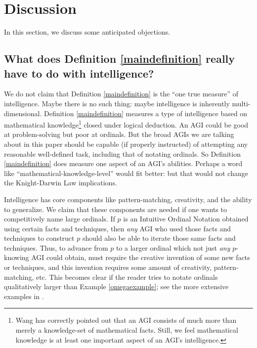 \documentclass[runningheads]{llncs}
\begin{document}
\section{Discussion}
\label{objectionsection}

In this section, we discuss some anticipated objections.

\subsection{What does Definition \ref{maindefinition} really have to do with intelligence?}

We do not claim that Definition \ref{maindefinition} is the ``one true measure'' of
intelligence. Maybe there is no such thing: maybe intelligence is inherently
multi-dimensional. Definition \ref{maindefinition} measures a type of
intelligence based on mathematical knowledge\footnote{Wang has
correctly pointed out \cite{wang2007} that an AGI consists of much more than merely
a knowledge-set of mathematical facts. Still, we feel mathematical knowledge is at least
one important aspect of an AGI's intelligence.} closed under logical deduction. An
AGI could be good at problem-solving
but poor at ordinals. But the broad AGIs we are talking about in this paper
should be capable (if properly
instructed) of attempting any reasonable well-defined task, including that of
notating ordinals. So Definition \ref{maindefinition} does
measure one aspect of an AGI's abilities. Perhaps
a word like
``mathematical-knowledge-level'' would fit better: but
that would not change
the Knight-Darwin Law implications.

Intelligence has core components like pattern-matching,
creativity, and the ability to generalize.
We claim that these components are needed if one wants to
competitively name large ordinals. If $p$ is an Intuitive Ordinal Notation
obtained using certain facts and techniques, then \emph{any} AGI who used those
facts and techniques to construct $p$ should also be able to iterate those same
facts and techniques.
Thus, to advance from
$p$ to a larger ordinal which not just \emph{any} $p$-knowing
AGI could obtain, must require
the creative invention of some new facts or techniques, and
this invention requires some amount of creativity,
pattern-matching, etc. This becomes clear if the reader tries to
notate ordinals qualitatively larger than Example \ref{omegaexample};
see the more extensive examples in \cite{github}.
\end{document}
